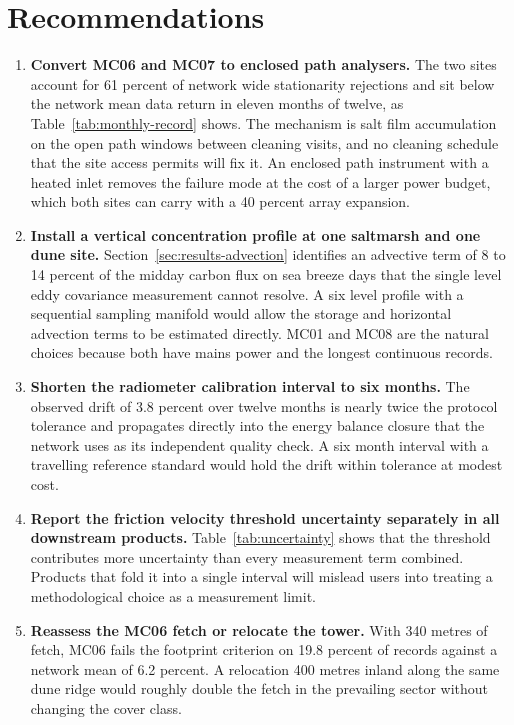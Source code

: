 \section{Recommendations}
\label{sec:recommendations}

\begin{enumerate}
  \item \label{rec:enclosure}
    \textbf{Convert MC06 and MC07 to enclosed path analysers.} The two sites
    account for 61 percent of network wide stationarity rejections and sit
    below the network mean data return in eleven months of twelve, as
    Table~\ref{tab:monthly-record} shows. The mechanism is salt film
    accumulation on the open path windows between cleaning visits, and no
    cleaning schedule that the site access permits will fix it. An enclosed
    path instrument with a heated inlet removes the failure mode at the cost of
    a larger power budget, which both sites can carry with a 40 percent array
    expansion.
  \item \label{rec:profile}
    \textbf{Install a vertical concentration profile at one saltmarsh and one
    dune site.} Section~\ref{sec:results-advection} identifies an advective term
    of 8 to 14 percent of the midday carbon flux on sea breeze days that the
    single level eddy covariance measurement cannot resolve. A six level
    profile with a sequential sampling manifold would allow the storage and
    horizontal advection terms to be estimated directly. MC01 and MC08 are the
    natural choices because both have mains power and the longest continuous
    records.
  \item \label{rec:radiometer}
    \textbf{Shorten the radiometer calibration interval to six months.} The
    observed drift of 3.8 percent over twelve months is nearly twice the
    protocol tolerance and propagates directly into the energy balance closure
    that the network uses as its independent quality check. A six month interval
    with a travelling reference standard would hold the drift within tolerance
    at modest cost.
  \item \label{rec:threshold}
    \textbf{Report the friction velocity threshold uncertainty separately in all
    downstream products.} Table~\ref{tab:uncertainty} shows that the threshold
    contributes more uncertainty than every measurement term combined. Products
    that fold it into a single interval will mislead users into treating a
    methodological choice as a measurement limit.
  \item \label{rec:footprint}
    \textbf{Reassess the MC06 fetch or relocate the tower.} With 340 metres of
    fetch, MC06 fails the footprint criterion on 19.8 percent of records against
    a network mean of 6.2 percent. A relocation 400 metres inland along the same
    dune ridge would roughly double the fetch in the prevailing sector without
    changing the cover class.
\end{enumerate}

